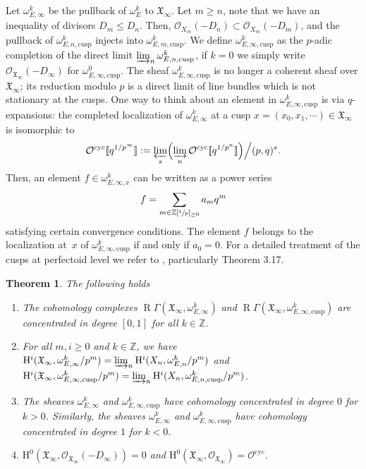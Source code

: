 \documentclass[11pt]{article}
\newcommand{\lcr}{[\![}
\newcommand{\rcr}{]\!]}
\newcommand{\cusp}{\mathrm{cusp}}
\newcommand{\cyc}{\mathrm{cyc}}
\numberwithin{equation}{section}
\newtheorem{theo}[prop]{Theorem}
\theoremstyle{definition}
\newcommand{\bb}[1]{\mathbb{#1}}
\newcommand{\n}[1]{\mathcal{#1}}
\newcommand{\f}[1]{\mathfrak{#1}}
\newcommand{\s}[1]{\mathscr{#1}}
\DeclareMathOperator{\R}{R}
\begin{document}
Let $\omega_{E,\infty}^{k}$ be the pullback of $\omega_E^k$ to $\f{X}_{\infty}$. Let $m\geq n$, note that we have an inequality of divisors $D_m\leq D_n$. Then, $\s{O}_{X_m}(-D_n)\subset \s{O}_{X_m}(-D_m)$, and the pullback of $\omega^k_{E,n,\cusp}$ injects into $\omega^k_{E,m,\cusp}$. We define $\omega^{k}_{E,\infty,\cusp}$ as the $p$-adic completion of the direct limit $\varinjlim_n \omega^k_{E,n,\cusp}$, if $k=0$ we simply write $\s{O}_{\f{X}_{\infty}}(-D_{\infty})$ for $\omega^0_{E,\infty, \cusp}$. The sheaf $\omega^k_{E,\infty,\cusp}$ is no longer a coherent sheaf over $\f{X}_\infty$; its reduction modulo $p$ is a direct limit of line bundles which is not stationary at the cusps. One way to think about an element in $\omega^k_{E,\infty,\cusp}$ is via $q$-expansions: the completed localization of $\omega^k_{E,\infty}$ at a cusp $x=(x_0,x_1,\cdots)\in \f{X}_{\infty}$ is isomorphic to
\[
\n{O}^{\cyc}\lcr q^{1/p^\infty}\rcr:= \varprojlim_{s} \Bigl(\varinjlim_n \n{O}^{\cyc}\lcr q^{1/p^n}\rcr\Bigr)\Big/(p,q)^s.
\]
Then, an element $f\in \omega^k_{E,\infty,x}$ can be written as a power series
\[
f= \sum_{m\in \bb{Z}[\sfrac{1}{p}]_{\geq 0}} a_m q^{m}
\]
satisfying certain convergence conditions. The element $f$ belongs to the localization at~$x$ of $\omega^k_{E,\infty, \cusp}$ if and only if $a_0=0$. For a detailed treatment of the cusps at perfectoid level we refer to \cite{heuer2020cusps}, particularly Theorem 3.17.

\begin{theo}
\label{corVanishingCohPerfectoid}
The following holds

\begin{enumerate}
\item\label{corVanishingCohPerfectoid1} The cohomology complexes $\R\Gamma(\f{X}_{\infty}, \omega^k_{E,\infty})$ and $\R\Gamma(\f{X}_{\infty}, \omega^k_{E,\infty,\cusp})$ are concentrated in degree $[0,1]$ for all $k\in \bb{Z}$.

\item\label{corVanishingCohPerfectoid2} For all $m,i\geq 0$ and $k\in \bb{Z}$, we have $\mathrm{H}^i(\f{X}_{\infty}, \omega^k_{E,\infty}/p^m)=\varinjlim_n \mathrm{H}^i(X_n, \omega^k_{E,n}/p^m)$ and $\mathrm{H}^i(\f{X}_{\infty}, \omega^k_{E,\infty,\cusp}/p^m)=\varinjlim_n \mathrm{H}^i(X_n, \omega^k_{E,n,\cusp}/p^m)$.

\item\label{corVanishingCohPerfectoid3} The sheaves $\omega_{E,\infty}^{k}$ and $\omega_{E,\infty,\cusp}^k$ have cohomology concentrated in degree $0$ for $k>0$. Similarly, the sheaves $\omega_{E,\infty}^{k}$ and $\omega_{E,\infty,\cusp}^{k}$ have cohomology concentrated in degree $1$ for $k<0$.

\item\label{corVanishingCohPerfectoid4} $\mathrm{H}^0(\f{X}_{\infty}, \s{O}_{\f{X}_{\infty}}(-D_{\infty}))=0$ and $\mathrm{H}^0(\f{X}_{\infty}, \s{O}_{\f{X}_{\infty}})= \n{O}^{\cyc} $.
\end{enumerate}
\end{theo}
\end{document}
